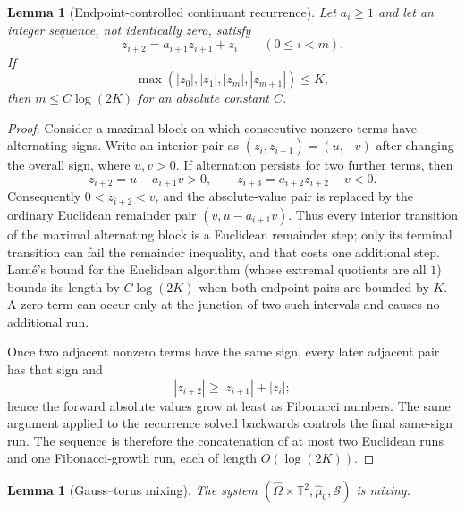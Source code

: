 \documentclass[11pt,a4paper]{amsart}
\newtheorem{lemma}[theorem]{Lemma}
\theoremstyle{definition}
\theoremstyle{remark}
\newcommand{\T}{\mathbb T}
\begin{document}
\begin{lemma}[Endpoint-controlled continuant recurrence]
\label{lem:endpoint-recurrence}
Let $a_i\ge1$ and let an integer sequence, not identically zero, satisfy
\[
 z_{i+2}=a_{i+1}z_{i+1}+z_i\qquad(0\le i<m).
\]
If
\[
 \max(|z_0|,|z_1|,|z_m|,|z_{m+1}|)\le K,
\]
then $m\le C\log(2K)$ for an absolute constant $C$.
\end{lemma}

\begin{proof}
Consider a maximal block on which consecutive nonzero terms have alternating
signs.  Write an interior pair as $(z_i,z_{i+1})=(u,-v)$ after changing the
overall sign, where $u,v>0$.  If alternation persists for two further terms,
then
\[
 z_{i+2}=u-a_{i+1}v>0,
 \qquad
 z_{i+3}=a_{i+2}z_{i+2}-v<0.
\]
Consequently $0<z_{i+2}<v$, and the absolute-value pair is replaced by the
ordinary Euclidean remainder pair $(v,u-a_{i+1}v)$.  Thus every interior
transition of the maximal alternating block is a Euclidean remainder step;
only its terminal transition can fail the remainder inequality, and that
costs one additional step.  Lam\'e's bound for the Euclidean
algorithm (whose extremal quotients are all $1$) bounds its length by
$C\log(2K)$ when both endpoint pairs are bounded by $K$.  A zero term can
occur only at the junction of two such intervals and causes no additional
run.

Once two adjacent nonzero terms have the same sign, every later adjacent pair
has that sign and
\[
 |z_{i+2}|\ge |z_{i+1}|+|z_i|;
\]
hence the forward absolute values grow at least as Fibonacci numbers.  The
same argument applied to the recurrence solved backwards controls the final
same-sign run.  The sequence is therefore the concatenation of at most two
Euclidean runs and one Fibonacci-growth run, each of length
$O(\log(2K))$.
\end{proof}

\begin{lemma}[Gauss--torus mixing]\label{lem:torus-mixing}
The system $(\widehat\Omega\times\T^2,\widehat\mu_0,\mathcal S)$ is mixing.
\end{lemma}
\end{document}
